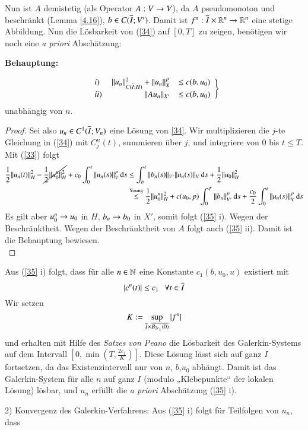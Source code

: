 Nun ist $A$ demistetig (als Operator $A:V\rightarrow V$), da $A$ pseudomonoton und beschränkt (Lemma \ref{4.16}),
$b\in C(\overline I;V')$. Damit ist $f^n:\overline I\times \mathbb{R}^n \rightarrow \mathbb{R}^n$ eine stetige Abbildung. Nun die Lösbarkeit
von (\ref{34})  auf $[0,T]$ zu zeigen, benötigen wir noch eine \textit{a priori} Abschätzung:

\noindent \textbf{Behauptung:}

\begin{align}\label{35}
\left.\begin{array}{lrl}
i)  & \,\|u_n\|^2_{C(\overline I;H)} + \|u_n\|_X^p &\leq c (b,u_0) \\
ii) & \|Au_n\|_{X'}&\leq c (b,u_0)
\end{array}\right\}
\end{align}
unabhängig von $n$.

\begin{proof}
    Sei also $u_n\in C^1(\overline I;V_n)$ eine Lösung von \ref{34}. Wir multiplizieren die $j$-te Gleichung in
    (\ref{34}) mit $C^n_j(t)$, summieren über $j$, und integriere von $0$ bis $t\leq T$. Mit (\ref{33})
    folgt
    \begin{align*}
        \frac12 \|u_n(t)\|_H^2-\cancel{\frac12\|u_0^n\|^2_H}+ c_0\int_0^t\|u_n(s)\|_V^p\, \mathrm{d} s&\leq
        \int_b^t\|b_n(s)\|_{V'} \|u_n(s)\|_V\, \mathrm{d} s + \frac12\|u_0\|_H^2\\
        &\overset{\text{Young}}{\leq} \frac12\|u_0^n\|_H^2+c(u_0,p) \int_0^T \|b_n\|_{V'}^p\, \mathrm{d} s +
        \frac{c_0}2 \int_0^t \|u_n(s)\|_V^p\, \mathrm{d} s
    \end{align*}
    Es gilt aber $u_0^n\rightarrow u_0$ in $H$, $b_n\rightarrow b_0$ in $X'$, somit folgt (\ref{35} i). Wegen der
    Beschränktheit. Wegen der Beschränktheit von $A$ folgt auch (\ref{35} ii). Damit ist die Behauptung
    bewiesen.\[ \]
\end{proof}
Aus (\ref{35} i) folgt, dass für alle $n\in\mathbb{N}$ eine Konstante $c_1(b,u_0,u)$ existiert mit
\[
    |c^n(t)|\leq c_1 \hspace{.25cm} \forall t\in \overline I
\]
Wir setzen
\[
    K:= \sup_{\overline I \times \overline{B_{2c_1}(0)}} |f^n|
\]
und erhalten mit Hilfe des \textit{Satzes von Peano} die Lösbarkeit des Galerkin-Systems auf dem
Intervall $[0,\min(T,\frac{2c_1}K)]$. Diese Lösung lässt sich auf ganz $I$ fortsetzen, da das
Existenzintervall nur von $n$, $b$,$u_0$ abhängt. Damit ist das Galerkin-System für alle $n$ auf ganz
$I$ (modulo „Klebepunkte“ der lokalen Lösung) lösbar, und $u_n$ erfüllt die \textit{a priori}
Abschätzung (\ref{35} i).
\item{2)}
Konvergenz des Galerkin-Verfahrens: Aus (\ref{35} i) folgt für Teilfolgen von $u_n$, dass
